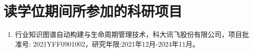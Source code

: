 \chapter{读学位期间所参加的科研项目}

\begin{enumerate}
    \item 行业知识图谱自动构建与生命周期管理技术，科大讯飞股份有限公司，项目批准号: 2021YFF0901002，研究年限:2021年12月-2024年11月。
\end{enumerate}
